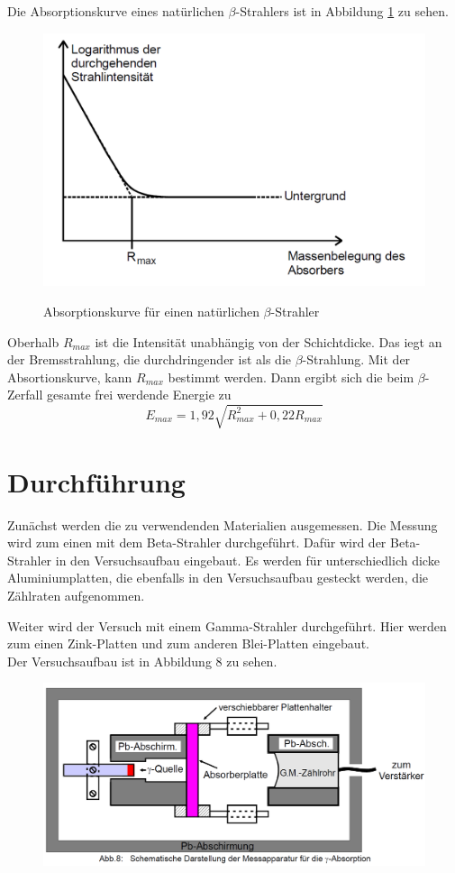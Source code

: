 Die Absorptionskurve eines natürlichen $\beta$-Strahlers ist in Abbildung \ref{fig:absorb} zu sehen.
\begin{figure}
  \includegraphics[width=\textwidth]{3.png}
  \caption{Absorptionskurve für einen natürlichen $\beta$-Strahler}\cite{anleitung}
  \label{fig:absorb}
\end{figure}
Oberhalb $R_{max}$ ist die Intensität unabhängig von der Schichtdicke.
Das iegt an der Bremsstrahlung, die durchdringender ist als die $\beta$-Strahlung.
Mit der Absortionskurve, kann $R_{max}$ bestimmt werden.
Dann ergibt sich die beim $\beta$-Zerfall gesamte frei werdende Energie zu
\begin{equation}
  E_{max}=1,92\sqrt{R_{max}^2+0,22R_{max}}
  \label{eqn:E}
\end{equation}

\section{Durchführung}

Zunächst werden die zu verwendenden Materialien ausgemessen.
Die Messung wird zum einen mit dem Beta-Strahler durchgeführt.
Dafür wird der Beta-Strahler in den Versuchsaufbau eingebaut.
Es werden für unterschiedlich dicke Aluminiumplatten,
die ebenfalls in den Versuchsaufbau gesteckt werden, die Zählraten aufgenommen.

Weiter wird der Versuch mit einem Gamma-Strahler durchgeführt.
Hier werden zum einen Zink-Platten und zum anderen Blei-Platten eingebaut.\\
Der Versuchsaufbau ist in Abbildung 8 zu sehen.

\begin{figure}
  \centering
  \includegraphics[width=\textwidth]{4.png}
  \cite{anleitung}%
  \label{fig:aufbau}
\end{figure}
